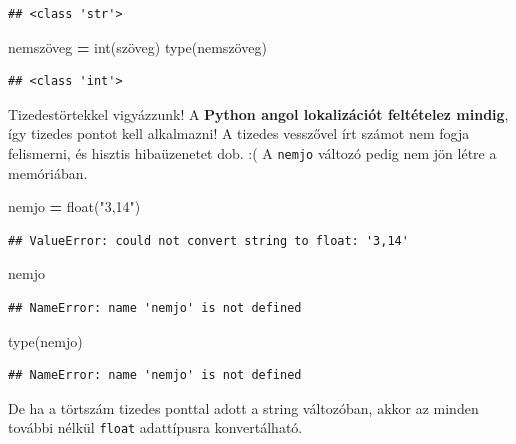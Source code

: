 \documentclass[
]{book}
\newenvironment{Shaded}{\begin{snugshade}}{\end{snugshade}}
\newcommand{\BuiltInTok}[1]{#1}
\newcommand{\NormalTok}[1]{#1}
\newcommand{\OperatorTok}[1]{\textcolor[rgb]{0.81,0.36,0.00}{\textbf{#1}}}
\newcommand{\StringTok}[1]{\textcolor[rgb]{0.31,0.60,0.02}{#1}}
\begin{document}
\begin{verbatim}
## <class 'str'>
\end{verbatim}

\begin{Shaded}
\begin{Highlighting}[]
\NormalTok{nemszöveg }\OperatorTok{=} \BuiltInTok{int}\NormalTok{(szöveg)}
\BuiltInTok{type}\NormalTok{(nemszöveg)}
\end{Highlighting}
\end{Shaded}

\begin{verbatim}
## <class 'int'>
\end{verbatim}

Tizedestörtekkel vigyázzunk! A \textbf{Python angol lokalizációt feltételez mindig}, így tizedes pontot kell alkalmazni! A tizedes vesszővel írt számot nem fogja felismerni, és hisztis hibaüzenetet dob. :( A \texttt{nemjo} változó pedig nem jön létre a memóriában.

\begin{Shaded}
\begin{Highlighting}[]
\NormalTok{nemjo }\OperatorTok{=} \BuiltInTok{float}\NormalTok{(}\StringTok{"3,14"}\NormalTok{)}
\end{Highlighting}
\end{Shaded}

\begin{verbatim}
## ValueError: could not convert string to float: '3,14'
\end{verbatim}

\begin{Shaded}
\begin{Highlighting}[]
\NormalTok{nemjo}
\end{Highlighting}
\end{Shaded}

\begin{verbatim}
## NameError: name 'nemjo' is not defined
\end{verbatim}

\begin{Shaded}
\begin{Highlighting}[]
\BuiltInTok{type}\NormalTok{(nemjo)}
\end{Highlighting}
\end{Shaded}

\begin{verbatim}
## NameError: name 'nemjo' is not defined
\end{verbatim}

De ha a törtszám tizedes ponttal adott a string változóban, akkor az minden további nélkül \texttt{float} adattípusra konvertálható.
\end{document}
